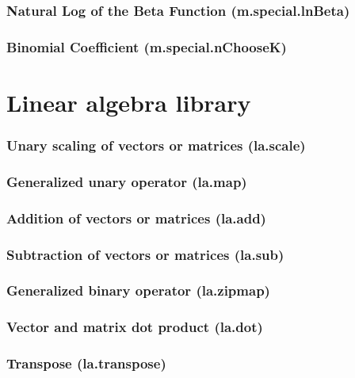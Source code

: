 \documentclass{article}
\theoremstyle{definition}
\begin{document}
\subsubsection{Natural Log of the Beta Function (m.special.lnBeta)}

\subsubsection{Binomial Coefficient (m.special.nChooseK)}

\pagebreak

\section{Linear algebra library}

\subsubsection{Unary scaling of vectors or matrices (la.scale)}

\subsubsection{Generalized unary operator (la.map)}

\subsubsection{Addition of vectors or matrices (la.add)}

\subsubsection{Subtraction of vectors or matrices (la.sub)}

\subsubsection{Generalized binary operator (la.zipmap)}

\subsubsection{Vector and matrix dot product (la.dot)}

\subsubsection{Transpose (la.transpose)}
\end{document}

